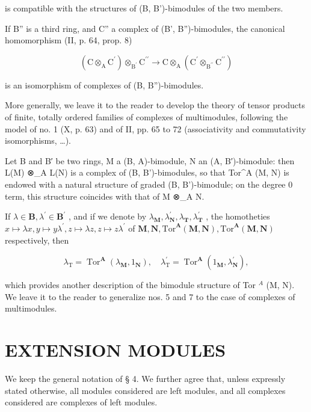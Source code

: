 is compatible with the structures of (B, B')-bimodules of the two members.

If B'' is a third ring, and C'' a complex of (B', B'')-bimodules, the canonical homomorphism (II, p. 64, prop. 8)

\[
\left(\mathrm{C} \otimes_ {\mathrm{A}} \mathrm{C} ^ {\prime}\right) \otimes_ {\mathrm{B} ^ {\prime}} \mathrm{C} ^ {\prime \prime} \rightarrow \mathrm{C} \otimes_ {\mathrm{A}} \left(\mathrm{C} ^ {\prime} \otimes_ {\mathrm{B} ^ {\prime \prime}} \mathrm{C} ^ {\prime \prime}\right)
\]

is an isomorphism of complexes of (B, B'')-bimodules.

More generally, we leave it to the reader to develop the theory of tensor products of finite, totally ordered families of complexes of multimodules, following the model of no. 1 (X, p. 63) and of II, pp. 65 to 72 (associativity and commutativity isomorphisms, \ldots).

Let B and B′ be two rings, M a (B, A)-bimodule, N an (A, B′)-bimodule: then L(M) ⊗\_A L(N) is a complex of (B, B')-bimodules, so that Tor\^{}A (M, N) is endowed with a natural structure of graded (B, B')-bimodule; on the degree 0 term, this structure coincides with that of M ⊗\_A N.

If \(\lambda\in\mathbf{B},\lambda^{\prime}\in\mathbf{B}^{\prime}\) , and if we denote by \(\lambda_{\mathbf{M}},\lambda_{\mathbf{N}}^{\prime},\lambda_{\mathbf{T}},\lambda_{\mathbf{T}}^{\prime}\) , the homotheties \(x\mapsto\lambda x,y\mapsto y\lambda^{\prime},z\mapsto\lambda z,z\mapsto z\lambda^{\prime}\) of \(\mathbf{M},\mathbf{N},\mathrm{Tor}^{\mathbf{A}}(\mathbf{M},\mathbf{N}),\mathrm{Tor}^{\mathbf{A}}(\mathbf{M},\mathbf{N})\) respectively, then

\[
\lambda_ {\mathrm{T}} = \operatorname{Tor} ^ {\mathbf {A}} \left(\lambda_ {\mathbf {M}}, 1 _ {\mathbf {N}}\right), \quad \lambda_ {\mathrm{T}} ^ {\prime} = \operatorname{Tor} ^ {\mathbf {A}} \left(1 _ {\mathbf {M}}, \lambda_ {\mathbf {N}} ^ {\prime}\right),
\]

which provides another description of the bimodule structure of Tor \(^{A}\) (M, N). We leave it to the reader to generalize nos. 5 and 7 to the case of complexes of multimodules.

\section{EXTENSION MODULES}

We keep the general notation of § 4. We further agree that, unless expressly stated otherwise, all modules considered are left modules, and all complexes considered are complexes of left modules.


